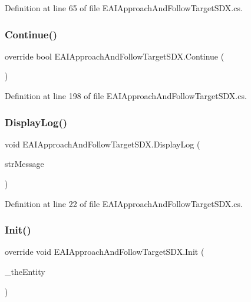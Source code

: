 Definition at line 65 of file E\+A\+I\+Approach\+And\+Follow\+Target\+S\+D\+X.\+cs.

\mbox{\label{class_e_a_i_approach_and_follow_target_s_d_x_aa6c1b4815975ccb63e7af74710fa4936}} 
\subsubsection{\texorpdfstring{Continue()}{Continue()}}
{\footnotesize\ttfamily override bool E\+A\+I\+Approach\+And\+Follow\+Target\+S\+D\+X.\+Continue (\begin{DoxyParamCaption}{ }\end{DoxyParamCaption})}



Definition at line 198 of file E\+A\+I\+Approach\+And\+Follow\+Target\+S\+D\+X.\+cs.

\mbox{\label{class_e_a_i_approach_and_follow_target_s_d_x_a56cb2c3da73cdb629a9354d2f3be8d06}} 
\subsubsection{\texorpdfstring{DisplayLog()}{DisplayLog()}}
{\footnotesize\ttfamily void E\+A\+I\+Approach\+And\+Follow\+Target\+S\+D\+X.\+Display\+Log (\begin{DoxyParamCaption}\item[{String}]{str\+Message }\end{DoxyParamCaption})}



Definition at line 22 of file E\+A\+I\+Approach\+And\+Follow\+Target\+S\+D\+X.\+cs.

\mbox{\label{class_e_a_i_approach_and_follow_target_s_d_x_ac2b966082c483ea7660520dddda21941}} 
\subsubsection{\texorpdfstring{Init()}{Init()}}
{\footnotesize\ttfamily override void E\+A\+I\+Approach\+And\+Follow\+Target\+S\+D\+X.\+Init (\begin{DoxyParamCaption}\item[{Entity\+Alive}]{\+\_\+the\+Entity }\end{DoxyParamCaption})}



